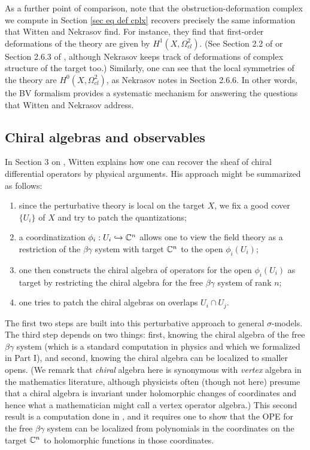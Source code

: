 As a further point of comparison, note that the obstruction-deformation complex we compute in Section \ref{sec eq def cplx} recovers precisely the same information that Witten and Nekrasov find.
For instance, they find that first-order deformations of the theory are given by $H^1(X, \Omega^2_{cl})$.
(See Section 2.2 of \cite{WittenCDO} or Section 2.6.3 of \cite{Nek}, although Nekrasov keeps track of deformations of complex structure of the target too.)
Similarly, one can see that the local symmetries of the theory are $H^0(X, \Omega^2_{cl})$, as Nekrasov notes in Section 2.6.6.
In other words, the BV formalism provides a systematic mechanism for answering the questions that Witten and Nekrasov address.

\subsection{Chiral algebras and observables}

In Section 3 on \cite{WittenCDO}, Witten explains how one can recover the sheaf of chiral differential operators by physical arguments.
His approach might be summarized as follows:
\begin{enumerate}
\item since the perturbative theory is local on the target $X$, we fix a good cover $\{U_i\}$ of $X$ and try to patch the quantizations;
\item a coordinatization $\phi_i: U_i \hookrightarrow \mathbb C^n$ allows one to view the field theory as a restriction of the $\beta\gamma$ system with target $\mathbb C^n$ to the open $\phi_i(U_i)$; 
\item one then constructs the chiral algebra of operators for the open $\phi_i(U_i)$ as target by restricting the chiral algebra for the free $\beta\gamma$ system of rank $n$;
\item one tries to patch the chiral algebras on overlaps $U_i \cap U_j$.
\end{enumerate}
The first two steps are built into this perturbative approach to general $\sigma$-models.
The third step depends on two things: 
first, knowing the chiral algebra of the free $\beta\gamma$ system 
(which is a standard computation in physics and which we formalized in Part I), 
and second, knowing the chiral algebra can be localized to smaller opens.
(We remark that {\em chiral} algebra here is synonymous with {\em vertex} algebra in the mathematics literature,
although physicists often (though not here) presume that a chiral algebra is invariant under holomorphic changes of coordinates 
and hence what a mathematician might call a vertex operator algebra.)
This second result is a computation done in \cite{MSV, GMS},
and it requires one to show that the OPE for the free $\beta\gamma$ system can be localized from polynomials in the coordinates on the target $\mathbb C^n$ to holomorphic functions in those coordinates.

